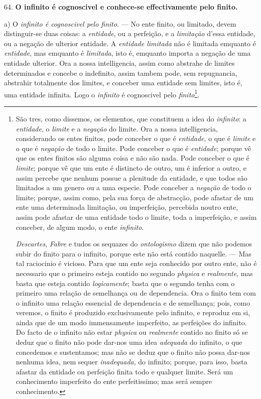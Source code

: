 64. \textbf{O infinito é cognoscivel e conhece-se effectivamente pelo finito.}

a) O \emph{infinito é cognoscivel pelo finito}. --- No ente finito, ou limitado, devem distinguir-se duas coisas: a \emph{entidade}, ou a perfeição, e a \emph{limitação} d'essa entidade, ou a negação de ulterior entidade. A \emph{entidade limitada} não é limitada emquanto é \emph{entidade}, mas emquanto é \emph{limitada}, isto é, emquanto importa a negação de uma entidade ulterior. Ora a nossa intelligencia, assim como abstrahe de limites determinados e concebe o indefinito, assim tambem pode, sem repugnancia, abstrahir totalmente dos limites, e conceber uma entidade sem limites, isto é, uma entidade infinita. Logo o \emph{infinito} é cognoscivel pelo \emph{finito}\footnote{São tres, como dissemos, os elementos, que constituem a idea do \emph{infinito}: a \emph{entidade}, o \emph{limite} e a \emph{negação} do limite. Ora a nossa intelligencia, considerando os entes finitos, pode conceber o que é \emph{entidade}, o que é \emph{limite} e o que é \emph{negação} de todo o limite. Pode conceber o que é \emph{entidade}; porque vê que os entes finitos são alguma coisa e não são nada. Pode conceber o que é \emph{limite}; porque vê que um ente é distincto de outro, um é inferior a outro, e assim percebe que nenhum possue a plenitude da entidade, e que todos são limitados a um genero ou a uma especie. Pode conceber a \emph{negação} de todo o limite; porque, assim como, pela sua força de abstracção, pode afastar de um ente uma determinada limitação, ou imperfeição, percebida noutro ente, assim pode afastar de uma entidade todo o limite, toda a imperfeição, e assim conceber, de algum modo, o ente \emph{infinito}.\par \emph{Descartes}, \emph{Fabre} e tudos os sequazes do \emph{ontologismo} dizem que não podemos subir do finito para o infinito, porque este não está contido naquelle. --- Mas tal raciocinio é vicioso. Para que um ente seja conhecido por outro ente, não é necessario que o primeiro esteja contido no segundo \emph{physica} e \emph{realmente}, mas basta que esteja contido \emph{logicamente}; basta que o segundo tenha com o primeiro uma relação de semelhança ou de dependencia. Ora o finito tem com o infinito uma relação essencial de dependencia e de semelhança; pois, como veremos, o finito é produzido exclusivamente pelo infinito, e reproduz em si, ainda que de um modo immensamente imperfeito, as perfeições do infinito. Do facto de o infinito não estar \emph{physica} ou \emph{realmente} contido no finito só se deduz que o finito não pode dar-nos uma idea \emph{adequada} do infinito, o que concedemos e sustentamos; mas não se deduz que o finito não possa dar-nos nenhuma idea, nem sequer \emph{inadequada}, do infinito; porque, para isso, basta afastar da entidade ou perfeição finita todo e qualquer limite. Será um conhecimento imperfeito do ente perfeitissimo; mas será sempre conhecimento.}.

